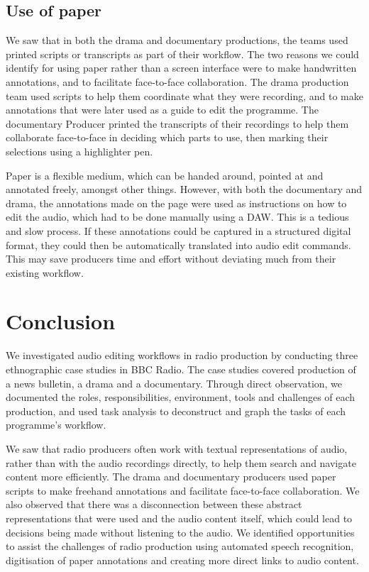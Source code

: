 \subsection{Use of paper}
We saw that in both the drama and documentary productions, the teams used printed scripts or transcripts as part of
their workflow. The two reasons we could identify for using paper rather than a screen interface were to make
handwritten annotations, and to facilitate face-to-face collaboration.  The drama production team used scripts to help
them coordinate what they were recording, and to make annotations that were later used as a guide to edit the
programme. The documentary Producer printed the transcripts of their recordings to help them collaborate face-to-face
in deciding which parts to use, then marking their selections using a highlighter pen.

Paper is a flexible medium, which can be handed around, pointed at and annotated freely, amongst other things.
However, with both the documentary and drama, the annotations made on the page were used as instructions on how to edit
the audio, which had to be done manually using a DAW. This is a tedious and slow process. If these annotations could be
captured in a structured digital format, they could then be automatically translated into audio edit commands. This may
save producers time and effort without deviating much from their existing workflow.

\section{Conclusion}\label{sec:ethno-conclusion}
We investigated audio editing workflows in radio production by conducting three ethnographic case studies in BBC
Radio. The case studies covered production of a news bulletin, a drama and a documentary.  Through direct observation,
we documented the roles, responsibilities, environment, tools and challenges of each production, and used task analysis
to deconstruct and graph the tasks of each programme's workflow.

We saw that radio producers often work with textual representations of audio, rather than with the audio recordings
directly, to help them search and navigate content more efficiently.  The drama and documentary producers used paper
scripts to make freehand annotations and facilitate face-to-face collaboration. We also observed that there was a
disconnection between these abstract representations that were used and the audio content itself, which could lead to
decisions being made without listening to the audio.  We identified opportunities to assist the challenges of radio
production using automated speech recognition, digitisation of paper annotations and creating more direct links to
audio content.

